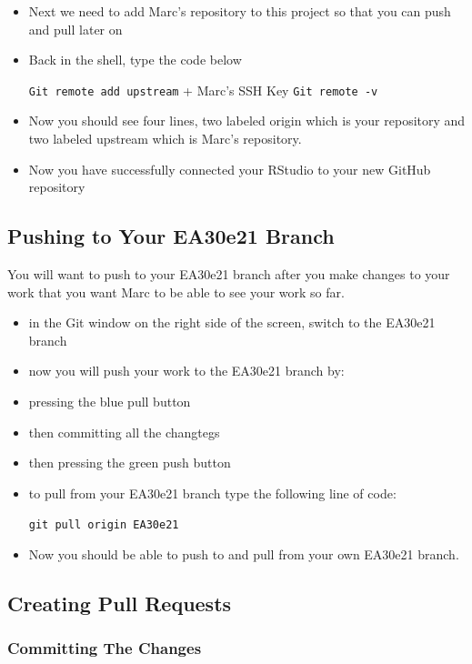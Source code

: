 \documentclass[12pt]{../SOP4_alpha}\usepackage[]{graphicx}\usepackage[]{xcolor}
\begin{document}
\begin{itemize}
    \item Next we need to add Marc's repository to this project so that you can push and pull later on
     

      \item Back in the shell, type the code below
        
        \indent\verb"Git remote add upstream" + Marc's SSH Key
        \indent\verb"Git remote -v"
       
      \item Now you should see four lines, two labeled origin which is your repository and two labeled upstream which is Marc’s repository. 
      \item Now you have successfully connected your RStudio to your new GitHub repository 
\end{itemize}


\subsection {Pushing to Your EA30e21 Branch}
You will want to push to your EA30e21 branch after you make changes to your work that you want Marc to be able to see your work so far. 

\begin{itemize}
  
  \item in the Git window on the right side of the screen, switch to the EA30e21 branch

\item now you will push your work to the EA30e21 branch by:
  \item pressing the blue pull button
  \item then committing all the changtegs
  \item then pressing the green push button
\item to pull from your EA30e21 branch type the following line of code:

  \indent\verb"git pull origin EA30e21"
\item Now you should be able to push to and pull from your own EA30e21 branch.

\end{itemize}


\subsection {Creating Pull Requests}


\subsubsection{Committing The Changes}
\end{document}
